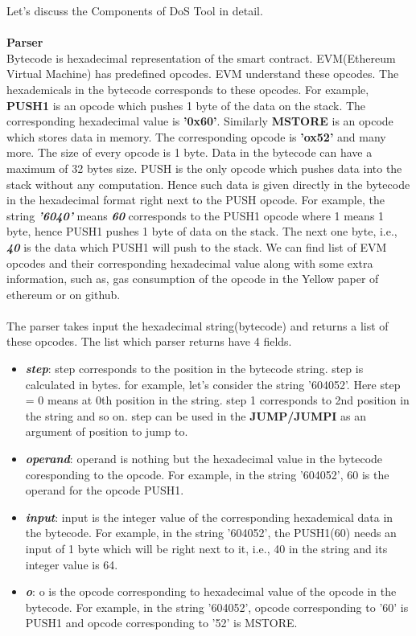 \documentclass{article}
\begin{document}
\newpage
\noindent Let's discuss the Components of DoS Tool in detail.\\
\\
\textbf{Parser}\\
Bytecode is hexadecimal representation of the smart contract. EVM(Ethereum Virtual Machine) has predefined opcodes. EVM understand these opcodes. The hexademicals in the bytecode corresponds to these opcodes. For example, \textbf{PUSH1} is an opcode which pushes 1 byte of the data on the stack. The corresponding hexadecimal value is \textbf{'0x60'}. Similarly \textbf{MSTORE} is an opcode which stores data in memory. The corresponding opcode is \textbf{'ox52'} and many more. The size of every opcode is 1 byte. Data in the bytecode can have a maximum of 32 bytes size. PUSH is the only opcode which pushes data into the stack without any computation. Hence such data is given directly in the bytecode in the hexadecimal format right next to the PUSH opcode. For example, the string \textbf{\emph{'6040'}} means \textbf{\emph{60}} corresponds to the PUSH1 opcode where 1 means 1 byte, hence PUSH1 pushes 1 byte of data on the stack. The next one byte, i.e., \textbf{\emph{40}} is the data which PUSH1 will push to the stack. We can find list of EVM opcodes and their corresponding hexadecimal value along with some extra information, such as, gas consumption of the opcode in the Yellow paper of ethereum or on github.\\
\\
The parser takes input the hexadecimal string(bytecode) and returns a list of these opcodes.
The list which parser returns have 4 fields.
\begin{itemize}
    \item \textbf{\emph{step}}: step corresponds to the position in the bytecode string. step is calculated in bytes. for example, let's consider the string '604052'. Here step = 0 means at 0th position in the string. step 1 corresponds to 2nd position in the string and so on. step can be used in the \textbf{JUMP/JUMPI} as an argument of position to jump to.
    \item \textbf{\emph{operand}}: operand is nothing but the hexadecimal value in the bytecode coresponding to the opcode. For example, in the string '604052', 60 is the operand for the opcode PUSH1.
    \item \textbf{\emph{input}}: input is the integer value of the corresponding hexademical data in the bytecode. For example, in the string '604052', the PUSH1(60) needs an input of 1 byte which will be right next to it, i.e., 40 in the string and its integer value is 64.
    \item \textbf{\emph{o}}: o is the opcode corresponding to hexadecimal value of the opcode in the bytecode. For example, in the string '604052', opcode corresponding to '60' is PUSH1 and opcode corresponding to '52' is MSTORE.
    
\end{itemize}
\end{document}
